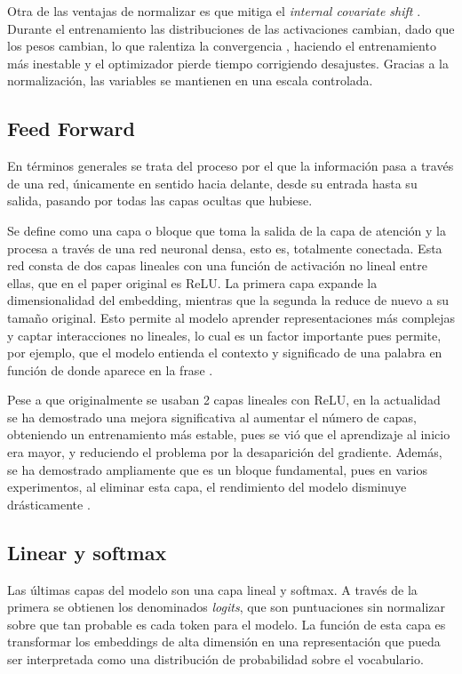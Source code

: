 \documentclass[11pt]{book}
\theoremstyle{plain}
\theoremstyle{definition}
\begin{document}
Otra de las ventajas de normalizar es que mitiga el \textit{internal covariate shift} \parencite{sharma2024addnorm}. Durante el entrenamiento las distribuciones de las activaciones cambian, dado que los pesos cambian, lo que ralentiza la convergencia \parencite{apxml_addnorm}, haciendo el entrenamiento más inestable y el optimizador pierde tiempo corrigiendo desajustes. Gracias a la normalización, las variables se mantienen en una escala controlada.


\subsection{Feed Forward} \label{subsec:feedforward}
En términos generales se trata del proceso por el que la información pasa a través de una red, únicamente en sentido hacia delante, desde su entrada hasta su salida, pasando por todas las capas ocultas que hubiese. 

Se define como una capa o bloque que toma la salida de la capa de atención y la procesa a través de una red neuronal densa, esto es, totalmente conectada. Esta red consta de dos capas lineales con una función de activación no lineal entre ellas, que en el paper original es ReLU. La primera capa expande la dimensionalidad del embedding, mientras que la segunda la reduce de nuevo a su tamaño original. Esto permite al modelo aprender representaciones más complejas y captar interacciones no lineales, lo cual es un factor importante pues permite, por ejemplo, que el modelo entienda el contexto y significado de una palabra en función de donde aparece en la frase \parencite{kyeg_feedforward_demystified}.

Pese a que originalmente se usaban 2 capas lineales con ReLU, en la actualidad se ha demostrado una mejora significativa al aumentar el número de capas, obteniendo un entrenamiento más estable, pues se vió que el aprendizaje al inicio era mayor, y reduciendo el problema por la desaparición del gradiente. Además, se ha demostrado ampliamente que es un bloque fundamental, pues en varios experimentos, al eliminar esta capa, el rendimiento del modelo disminuye drásticamente \parencite{gerber2025ffn}.


\subsection{Linear y softmax}
Las últimas capas del modelo son una capa lineal y softmax. A través de la primera se obtienen los denominados \textit{logits}, que son puntuaciones sin normalizar sobre que tan probable es cada token para el modelo. La función de esta capa es transformar los embeddings de alta dimensión en una representación que pueda ser interpretada como una distribución de probabilidad sobre el vocabulario.
\end{document}
